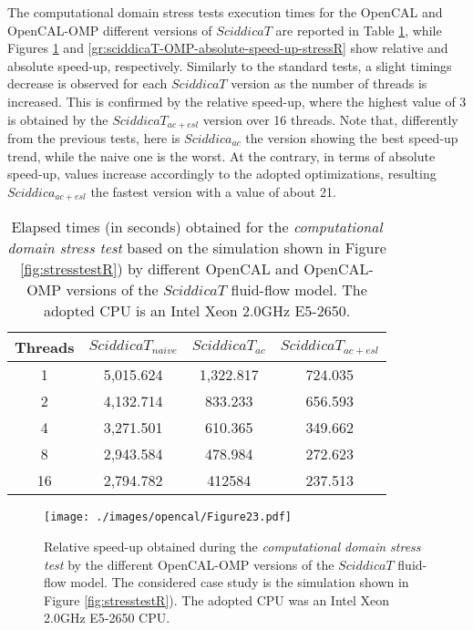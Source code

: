 The computational domain stress tests execution times for the
OpenCAL and OpenCAL-OMP different versions of $SciddicaT$ are
reported in Table \ref{tab:sciddicaT-OMP-execution-times-stressR},
while Figures \ref{gr:sciddicaT-OMP-relative-speed-up-stressR} and
\ref{gr:sciddicaT-OMP-absolute-speed-up-stressR} show relative and
absolute speed-up, respectively. Similarly to the standard tests,
a slight timings decrease is observed for each $SciddicaT$ version
as the number of threads is increased. This is confirmed by the
relative speed-up, where the highest value of 3 is obtained by the
$SciddicaT_{ac+esl}$ version over 16 threads. Note that,
differently from the previous tests, here is $Sciddica_{ac}$ the
version showing the best speed-up trend, while the naive one is
the worst. At the contrary, in terms of absolute speed-up, values
increase accordingly to the adopted optimizations, resulting
$Sciddica_{ac+esl}$ the fastest version with a value of about 21.
\begin{table}
	\centering
	\begin{tabular}{cccc}
		\hline Threads & $SciddicaT_{naive}$ & $SciddicaT_{ac}$ &
		$SciddicaT_{ac+esl}$\\ \hline 1 & 5,015.624 & 1,322.817 &
		724.035\\ 2 & 4,132.714 & 833.233 & 656.593\\ 4 & 3,271.501 &
		610.365 & 349.662\\ 8 & 2,943.584 & 478.984 & 272.623\\ 16 &
		2,794.782 & 412584 & 237.513\\ \hline
	\end{tabular}
	\caption{Elapsed times (in seconds) obtained for the \emph{computational domain stress test} based on the simulation shown in Figure \ref{fig:stresstestR}) by different OpenCAL and OpenCAL-OMP versions
	of the $SciddicaT$ fluid-flow model. The adopted CPU is an Intel Xeon
	2.0GHz E5-2650.}
	\label{tab:sciddicaT-OMP-execution-times-stressR}
\end{table}

\begin{figure}
	\begin{center}
		\texttt{[image: ./images/opencal/Figure23.pdf]}
		\caption{Relative speed-up obtained during the \emph{computational domain
				stress test} by the different OpenCAL-OMP versions of the
			$SciddicaT$ fluid-flow model. The considered case study is the
			simulation shown in Figure \ref{fig:stresstestR}). The adopted CPU was
			an Intel Xeon 2.0GHz E5-2650 CPU.}
		\label{gr:sciddicaT-OMP-relative-speed-up-stressR}
	\end{center}
\end{figure}

